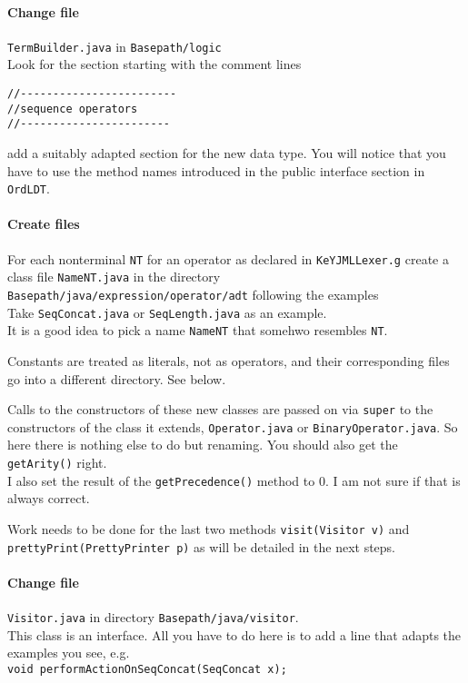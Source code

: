 \documentclass[11pt]{article}
\begin{document}
\paragraph{Change file} \verb+TermBuilder.java+ in \verb+Basepath/logic+\\
Look for the section starting with the comment lines
\begin{verbatim}
//------------------------
//sequence operators
//-----------------------
\end{verbatim}
add a suitably adapted section for the new data type. You will notice that you have to use the
method names introduced in the public interface section in 
\verb+OrdLDT+.
\paragraph{Create files} For each nonterminal \verb+NT+ for an operator as declared in  \verb+KeYJMLLexer.g+ create a class file \verb+NameNT.java+ in the directory \\
\verb+Basepath/java/expression/operator/adt+ following the examples\\ 
Take \verb+SeqConcat.java+ or \verb+SeqLength.java+ as an example.\\
It is a good idea to pick a name \verb+NameNT+ that somehwo resembles \verb+NT+.

Constants are treated as literals, not as operators, and their corresponding files go into a different directory. See below.

Calls to the constructors of these new classes are passed on via \verb+super+ to the
constructors of the class it extends,   \verb+Operator.java+ or \verb+BinaryOperator.java+.
So here there is nothing else to do but renaming.
You should also get the \verb+getArity()+ right. \\
I also set the result of the \verb+getPrecedence()+ method to $0$. I am not 
sure if that is always correct.

Work needs to be done for the last two methods \verb+visit(Visitor v)+ and
\verb+prettyPrint(PrettyPrinter p)+ as will be detailed in the next steps.

\paragraph{Change file} \verb+Visitor.java+ in directory
\verb+Basepath/java/visitor+.\\[5pt]
This class is an interface. All you have to do here is to add a line that
adapts the examples you see, e.g.\\[5pt]
\verb+void performActionOnSeqConcat(SeqConcat x);+
\end{document}
